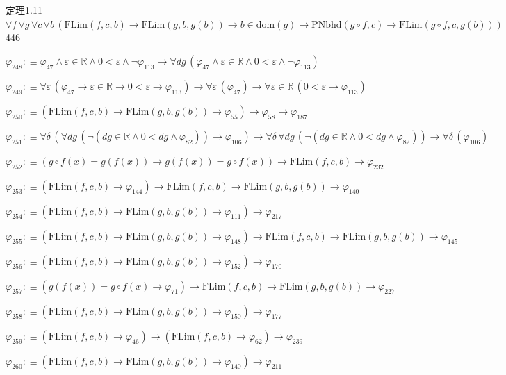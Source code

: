 \begin{fullproof}{定理1.11}{$\forall f\,\forall g\,\forall c\,\forall b\,(\mathrm{FLim}(f,c,b) \to \mathrm{FLim}(g,b,g(b)) \to b \in \mathrm{dom}(g) \to \mathrm{PNbhd}(g \circ f,c) \to \mathrm{FLim}(g \circ f,c,g(b)))$}{446}
\begin{abbrevlist}
\item $\varphi_{248} :\equiv \varphi_{47} \land \varepsilon \in \mathbb{R} \land 0 < \varepsilon \land \neg \varphi_{113} \to \forall \mathit{dg}\,(\varphi_{47} \land \varepsilon \in \mathbb{R} \land 0 < \varepsilon \land \neg \varphi_{113})$
\item $\varphi_{249} :\equiv \forall \varepsilon\,(\varphi_{47} \to \varepsilon \in \mathbb{R} \to 0 < \varepsilon \to \varphi_{113}) \to \forall \varepsilon\,(\varphi_{47}) \to \forall \varepsilon \in \mathbb{R}\,(0 < \varepsilon \to \varphi_{113})$
\item $\varphi_{250} :\equiv (\mathrm{FLim}(f,c,b) \to \mathrm{FLim}(g,b,g(b)) \to \varphi_{55}) \to \varphi_{58} \to \varphi_{187}$
\item $\varphi_{251} :\equiv \forall \delta\,(\forall \mathit{dg}\,(\neg (\mathit{dg} \in \mathbb{R} \land 0 < \mathit{dg} \land \varphi_{82})) \to \varphi_{106}) \to \forall \delta\,\forall \mathit{dg}\,(\neg (\mathit{dg} \in \mathbb{R} \land 0 < \mathit{dg} \land \varphi_{82})) \to \forall \delta\,(\varphi_{106})$
\item $\varphi_{252} :\equiv (g \circ f(x) = g(f(x)) \to g(f(x)) = g \circ f(x)) \to \mathrm{FLim}(f,c,b) \to \varphi_{232}$
\item $\varphi_{253} :\equiv (\mathrm{FLim}(f,c,b) \to \varphi_{144}) \to \mathrm{FLim}(f,c,b) \to \mathrm{FLim}(g,b,g(b)) \to \varphi_{140}$
\item $\varphi_{254} :\equiv (\mathrm{FLim}(f,c,b) \to \mathrm{FLim}(g,b,g(b)) \to \varphi_{111}) \to \varphi_{217}$
\item $\varphi_{255} :\equiv (\mathrm{FLim}(f,c,b) \to \mathrm{FLim}(g,b,g(b)) \to \varphi_{148}) \to \mathrm{FLim}(f,c,b) \to \mathrm{FLim}(g,b,g(b)) \to \varphi_{145}$
\item $\varphi_{256} :\equiv (\mathrm{FLim}(f,c,b) \to \mathrm{FLim}(g,b,g(b)) \to \varphi_{152}) \to \varphi_{170}$
\item $\varphi_{257} :\equiv (g(f(x)) = g \circ f(x) \to \varphi_{71}) \to \mathrm{FLim}(f,c,b) \to \mathrm{FLim}(g,b,g(b)) \to \varphi_{227}$
\item $\varphi_{258} :\equiv (\mathrm{FLim}(f,c,b) \to \mathrm{FLim}(g,b,g(b)) \to \varphi_{150}) \to \varphi_{177}$
\item $\varphi_{259} :\equiv (\mathrm{FLim}(f,c,b) \to \varphi_{46}) \to (\mathrm{FLim}(f,c,b) \to \varphi_{62}) \to \varphi_{239}$
\item $\varphi_{260} :\equiv (\mathrm{FLim}(f,c,b) \to \mathrm{FLim}(g,b,g(b)) \to \varphi_{140}) \to \varphi_{211}$

\end{abbrevlist}
\end{fullproof}
